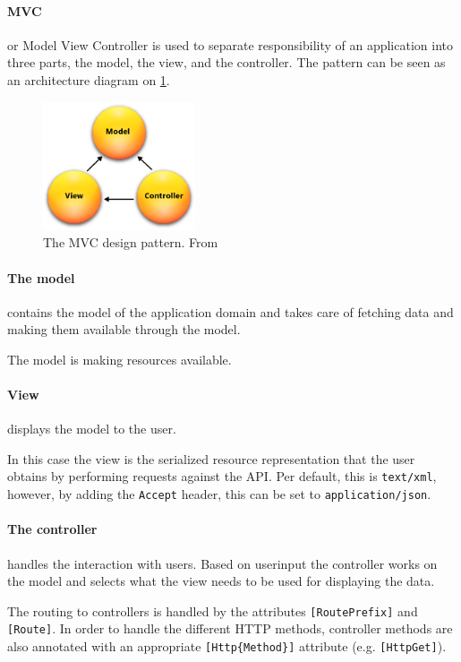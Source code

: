 \paragraph{MVC} or Model View Controller\citet{aspmvc} is used to separate responsibility of an application into three parts, the model, the view, and the controller.
The pattern can be seen as an architecture diagram on \cref{mvcdiagram}.

\begin{figure}[h]
\center
\includegraphics[width=0.4\textwidth]{graphics/mvc}
\caption{The MVC design pattern. From \citet{aspmvc}}
\label{mvcdiagram}
\end{figure}

\paragraph{The model } contains the model of the application domain and takes care of fetching data and making them available through the model.

The model is making resources available.

\paragraph{View} displays the model to the user.

In this case the view is the serialized resource representation that the user obtains by performing requests against the API.
Per default, this is \texttt{text/xml}, however, by adding the \texttt{Accept} header, this can be set to \texttt{application/json}.\cite[section 14]{http_specification}

\paragraph{The controller} handles the interaction with users. Based on userinput the controller works on the model and selects what the view needs to be used for displaying the data.

The routing to controllers is handled by the attributes \texttt{[RoutePrefix]} and \texttt{[Route]}.
In order to handle the different HTTP methods, controller methods are also annotated with an appropriate \texttt{[Http\{Method\}]} attribute (e.g. \texttt{[HttpGet]}).\cite{asp_routing}